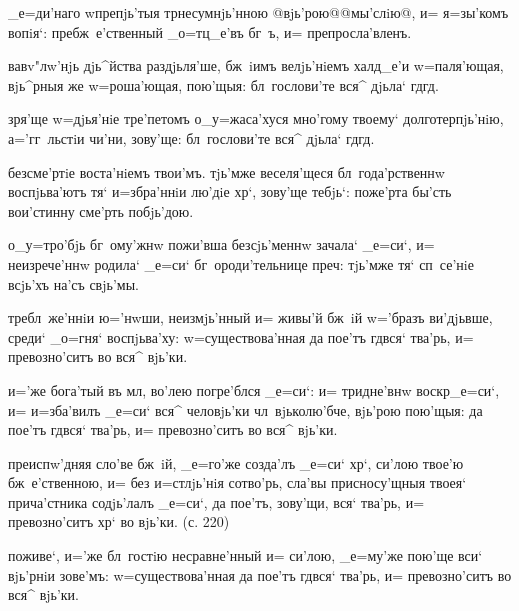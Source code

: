 _е=ди'наго w\т препjь'тыя тр несумнjь'нною 
@вjь'рою@{@мы'слiю@}, и= я=зы'комъ вопiя`: 
пребж~е'ственный _о=тц_е'въ бг~ъ, и= препросла'вленъ.


вавv"лw'нjь дjь^йства раздjьля'ше, бж~iимъ велjь'нiемъ 
халд_е'и w=паля'ющая, вjь^рныя же w=роша'ющая, пою'щыя: 
бл~гослови'те вся^ дjьла` гд гд.

зря'ще w=дjья'нiе тре'петомъ о_у=жаса'хуся мно'гому 
твоему` долготерпjь'нiю, а='гг~льстiи чи'ни, зову'ще: 
бл~гослови'те вся^ дjьла` гд гд.

безсме'ртiе воста'нiемъ твои'мъ. тjь'мже веселя'щеся 
бл~года'рственнw воспjьва'ютъ тя` и=збра'ннiи лю'дiе 
хр`, зову'ще тебjь`: поже'рта бы'сть вои'стинну 
сме'рть побjь'дою.

о_у=тро'бjь бг~ому'жнw пожи'вша безсjь'меннw зачала` 
_е=си`, и= неизрече'ннw родила` _е=си` бг~ороди'тельнице 
преч: тjь'мже тя` сп~се'нiе всjь'хъ на'съ свjь'мы.


требл~же'ннiи ю='нwши, неизмjь'нный и= живы'й бж~iй 
w='бразъ ви'дjьвше, среди` _о=гня` воспjьва'ху: 
w=существова'нная да пое'тъ гд вся` тва'рь, и= 
превозно'ситъ во вся^ вjь'ки.

и='же бога'тый въ мл, во'лею погре'блся _е=си`: и= 
тридне'внw воскр _е=си`, и= и=зба'вилъ _е=си` вся^ 
человjь'ки чл~вjьколю'бче, вjь'рою пою'щыя: да пое'тъ 
гд вся` тва'рь, и= превозно'ситъ во вся^ вjь'ки.

преиспw'дняя сло'ве бж~iй, _е=го'же созда'лъ _е=си` 
хр`, си'лою твое'ю бж~е'ственною, и= без\ъ 
и=стлjь'нiя сотво'рь, сла'вы присносу'щныя твоея` 
прича'стника содjь'лалъ _е=си`, да пое'тъ, зову'щи, вся` 
тва'рь, и= превозно'ситъ хр` во вjь'ки. (с. 220)


поживе`, и='же бл~гостiю несравне'нный и= си'лою, 
_е=му'же пою'ще вси` вjь'рнiи зове'мъ: w=существова'нная 
да пое'тъ гд вся` тва'рь, и= превозно'ситъ во вся^ 
вjь'ки.

